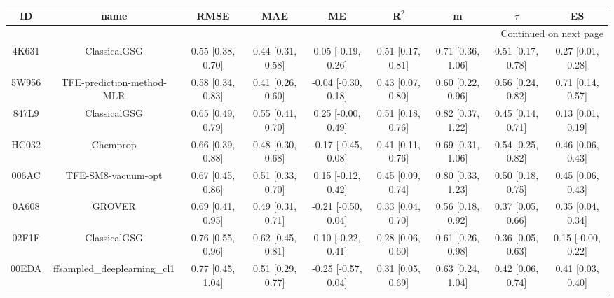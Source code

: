 \documentclass{article}
\begin{document}
\begin{center}
\scriptsize
\begin{longtable}{|ccccccccc|}
\toprule
    ID &                                               name &               RMSE &                MAE &                    ME &              R$^2$ &                     m &                $\tau$ &                    ES \\
\midrule
\endhead
\midrule
\multicolumn{9}{r}{{Continued on next page}} \\
\midrule
\endfoot

\bottomrule
\endlastfoot
 4K631 &                                       ClassicalGSG &  0.55 [0.38, 0.70] &  0.44 [0.31, 0.58] &    0.05 [-0.19, 0.26] &  0.51 [0.17, 0.81] &     0.71 [0.36, 1.06] &     0.51 [0.17, 0.78] &     0.27 [0.01, 0.28] \\
 5W956 &                          TFE-prediction-method-MLR &  0.58 [0.34, 0.83] &  0.41 [0.26, 0.60] &   -0.04 [-0.30, 0.18] &  0.43 [0.07, 0.80] &     0.60 [0.22, 0.96] &     0.56 [0.24, 0.82] &     0.71 [0.14, 0.57] \\
 847L9 &                                       ClassicalGSG &  0.65 [0.49, 0.79] &  0.55 [0.41, 0.70] &    0.25 [-0.00, 0.49] &  0.51 [0.18, 0.76] &     0.82 [0.37, 1.22] &     0.45 [0.14, 0.71] &     0.13 [0.01, 0.19] \\
 HC032 &                                           Chemprop &  0.66 [0.39, 0.88] &  0.48 [0.30, 0.68] &   -0.17 [-0.45, 0.08] &  0.41 [0.11, 0.76] &     0.69 [0.31, 1.06] &     0.54 [0.25, 0.82] &     0.46 [0.06, 0.43] \\
 006AC &                                 TFE-SM8-vacuum-opt &  0.67 [0.45, 0.86] &  0.51 [0.33, 0.70] &    0.15 [-0.12, 0.42] &  0.45 [0.09, 0.74] &     0.80 [0.33, 1.23] &     0.50 [0.18, 0.75] &     0.45 [0.06, 0.43] \\
 0A608 &                                             GROVER &  0.69 [0.41, 0.95] &  0.49 [0.31, 0.71] &   -0.21 [-0.50, 0.04] &  0.33 [0.04, 0.70] &     0.56 [0.18, 0.92] &     0.37 [0.05, 0.66] &     0.35 [0.04, 0.34] \\
 02F1F &                                       ClassicalGSG &  0.76 [0.55, 0.96] &  0.62 [0.45, 0.81] &    0.10 [-0.22, 0.41] &  0.28 [0.06, 0.60] &     0.61 [0.26, 0.98] &     0.36 [0.05, 0.63] &    0.15 [-0.00, 0.22] \\
 00EDA &                       ffsampled\_deeplearning\_cl1 &  0.77 [0.45, 1.04] &  0.51 [0.29, 0.77] &   -0.25 [-0.57, 0.04] &  0.31 [0.05, 0.69] &     0.63 [0.24, 1.04] &     0.42 [0.06, 0.74] &     0.41 [0.03, 0.40] \\

\end{longtable}
\end{center}
\end{document}
